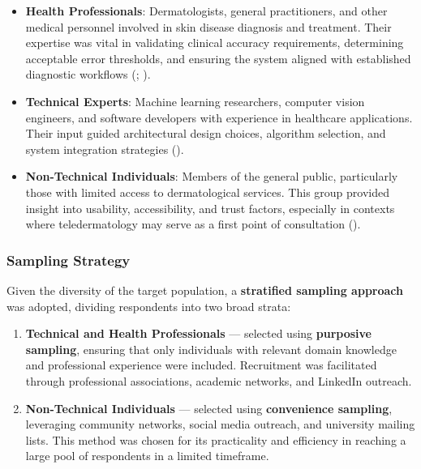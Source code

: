 \documentclass[
  12pt,
  oneside]{article}
\providecommand{\tightlist}{%
  \setlength{\itemsep}{0pt}\setlength{\parskip}{0pt}}
\begin{document}
\begin{itemize}
\tightlist
\item
  \textbf{Health Professionals}: Dermatologists, general practitioners,
  and other medical personnel involved in skin disease diagnosis and
  treatment. Their expertise was vital in validating clinical accuracy
  requirements, determining acceptable error thresholds, and ensuring
  the system aligned with established diagnostic workflows
  (;
  ).\\
\item
  \textbf{Technical Experts}: Machine learning researchers, computer
  vision engineers, and software developers with experience in
  healthcare applications. Their input guided architectural design
  choices, algorithm selection, and system integration strategies
  ().\\
\item
  \textbf{Non-Technical Individuals}: Members of the general public,
  particularly those with limited access to dermatological services.
  This group provided insight into usability, accessibility, and trust
  factors, especially in contexts where teledermatology may serve as a
  first point of consultation ().
\end{itemize}

\subsubsection{Sampling Strategy}\label{sampling-strategy}

Given the diversity of the target population, a \textbf{stratified
sampling approach} was adopted, dividing respondents into two broad
strata:

\begin{enumerate}
\def\labelenumi{\arabic{enumi}.}
\tightlist
\item
  \textbf{Technical and Health Professionals} --- selected using
  \textbf{purposive sampling}, ensuring that only individuals with
  relevant domain knowledge and professional experience were included.
  Recruitment was facilitated through professional associations,
  academic networks, and LinkedIn outreach.\\
\item
  \textbf{Non-Technical Individuals} --- selected using
  \textbf{convenience sampling}, leveraging community networks, social
  media outreach, and university mailing lists. This method was chosen
  for its practicality and efficiency in reaching a large pool of
  respondents in a limited timeframe.
\end{enumerate}
\end{document}
